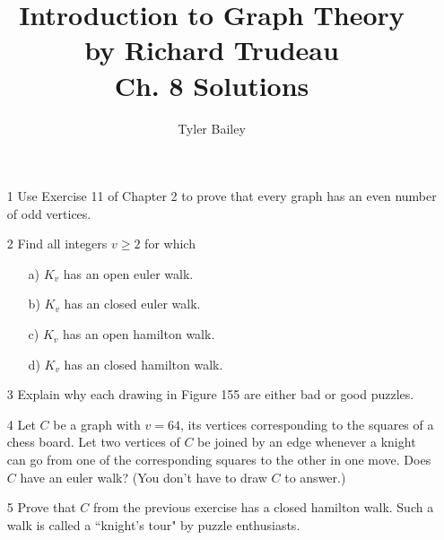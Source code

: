 \documentclass{article}
\begin{document}
	\title{%
  	Introduction to Graph Theory \\
  		\large by Richard Trudeau \\
   		Ch. 8 Solutions}
   		\author{Tyler Bailey}
	\maketitle

	\begin{enumerate}
		\item[1] Use Exercise 11 of Chapter 2 to prove that every graph has an even number of odd vertices.
		\item[2] Find all integers $v \geq 2$ for which
		\begin{enumerate}
			\item[a)] $K_v$ has an open euler walk.
			\item[b)] $K_v$ has an closed euler walk.
			\item[c)] $K_v$ has an open hamilton walk.
			\item[d)] $K_v$ has an closed hamilton walk.
		\end{enumerate}
		\item[3] Explain why each drawing in Figure 155 are either bad or good puzzles.
		\item[4] Let $C$ be a graph with $v = 64$, its vertices corresponding to the squares of a chess board. Let two vertices of $C$ be joined by an edge whenever a knight can go from one of the corresponding squares to the other in one move. Does $C$ have an euler walk? (You don't have to draw $C$ to answer.)
		\item[5] Prove that $C$ from the previous exercise has a closed hamilton walk. Such a walk is called a ``knight's tour" by puzzle enthusiasts.
	\end{enumerate}
\end{document}
